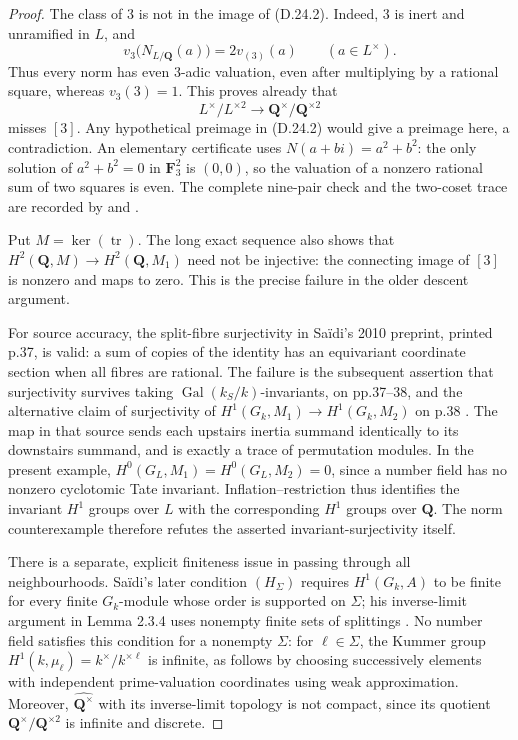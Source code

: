 \begin{proof}
The class of $3$ is not in the image of (D.24.2).  Indeed, $3$ is
inert and unramified in $L$, and
\[
 v_3\bigl(N_{L/\mathbf Q}(a)\bigr)
       =2v_{(3)}(a)\qquad(a\in L^\times).
\]
Thus every norm has even $3$-adic valuation, even after multiplying
by a rational square, whereas $v_3(3)=1$.  This proves already that
\[
 L^\times/L^{\times2}\longrightarrow
 \mathbf Q^\times/\mathbf Q^{\times2}
\]
misses $[3]$.  Any hypothetical preimage in (D.24.2) would give a
preimage here, a contradiction.  An elementary certificate uses
$N(a+bi)=a^2+b^2$: the only solution of
$a^2+b^2=0$ in $\mathbf F_3^2$ is $(0,0)$, so the valuation of a
nonzero rational sum of two squares is even.  The complete
nine-pair check and the two-coset trace are recorded by
 and
.

Put $M=\ker(\operatorname{tr})$.  The long exact sequence also
shows that $H^2(\mathbf Q,M)\to H^2(\mathbf Q,M_1)$ need not be
injective: the connecting image of $[3]$ is nonzero and maps to
zero.  This is the precise failure in the older descent argument.

For source accuracy, the split-fibre surjectivity in Sa\"idi's
2010 preprint, printed p.37, is valid: a sum of copies of the
identity has an equivariant coordinate section when all fibres
are rational.  The failure is the subsequent assertion that
surjectivity survives taking
$\operatorname{Gal}(k_S/k)$-invariants, on pp.37--38, and the
alternative claim of surjectivity of
$H^1(G_k,M_1)\to H^1(G_k,M_2)$ on p.38
\cite[proof of Theorem 2.6(ii)]{D_Saidi2010}.
The map in that source sends each upstairs inertia summand
identically to its downstairs summand, and is exactly a trace of
permutation modules.  In the present example,
$H^0(G_L,M_1)=H^0(G_L,M_2)=0$, since a number field has no
nonzero cyclotomic Tate invariant.  Inflation--restriction thus
identifies the invariant $H^1$ groups over $L$ with the corresponding
$H^1$ groups over $\mathbf Q$.  The norm counterexample therefore
refutes the asserted invariant-surjectivity itself.

There is a separate, explicit finiteness issue in passing through
all neighbourhoods.  Sa\"idi's later condition $(H_\Sigma)$ requires
$H^1(G_k,A)$ to be finite for every finite $G_k$-module whose order
is supported on $\Sigma$; his inverse-limit argument in Lemma 2.3.4
uses nonempty finite sets of splittings
\cite[Definition 2.3.3 and Lemma 2.3.4]{D_Saidi2019}.
No number field satisfies this condition for a nonempty $\Sigma$:
for $\ell\in\Sigma$, the Kummer group
$H^1(k,\mu_\ell)=k^\times/k^{\times\ell}$ is infinite, as follows
by choosing successively elements with independent prime-valuation
coordinates using weak approximation.  Moreover,
$\widehat{\mathbf Q^\times}$ with its inverse-limit topology is
not compact, since its quotient
$\mathbf Q^\times/\mathbf Q^{\times2}$ is infinite and discrete.


\end{proof}
